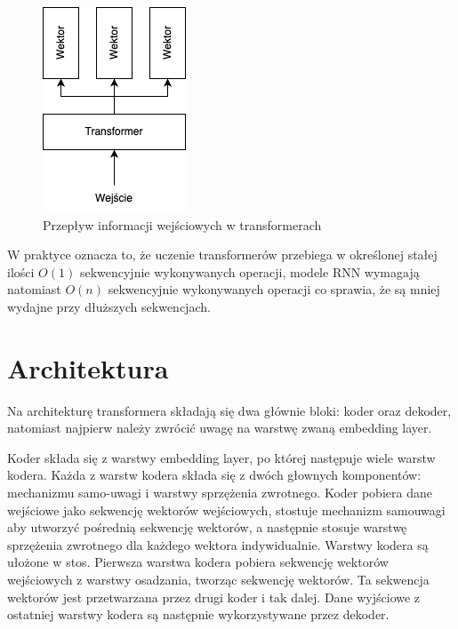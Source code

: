 \documentclass[12pt,a4paper,twoside]{book} %
\begin{document}
\begin{figure}[H]
    \centering
	\includegraphics[scale=0.60]{figs/transformer.png}
	\caption{Przepływ informacji wejściowych w transformerach}
	\label{fig:transformer_schema}
\end{figure}

W praktyce oznacza to, że uczenie transformerów przebiega w określonej stałej ilości $O(1)$ sekwencyjnie wykonywanych operacji, modele RNN wymagają natomiast $O(n)$ sekwencyjnie wykonywanych operacji co sprawia, że są mniej wydajne przy dłuższych sekwencjach.

\section{Architektura}

Na architekturę transformera składają się dwa głównie bloki: koder oraz dekoder, natomiast najpierw należy zwrócić uwagę na warstwę zwaną embedding layer.
 

Koder składa się z warstwy embedding layer, po której następuje wiele warstw kodera.
Każda z warstw kodera składa się z dwóch głownych komponentów: mechanizmu samo-uwagi i warstwy sprzężenia zwrotnego. 
Koder pobiera dane wejściowe jako sekwencję wektorów wejściowych, stostuje mechanizm samouwagi aby utworzyć pośrednią sekwencję wektorów, a następnie stosuje warstwę sprzężenia zwrotnego dla każdego wektora indywidualnie.
Warstwy kodera są ułożone w stos. 
Pierwsza warstwa kodera pobiera sekwencję wektorów wejściowych z warstwy osadzania, tworząc sekwencję wektorów. 
Ta sekwencja wektorów jest przetwarzana przez drugi koder i tak dalej. 
Dane wyjściowe z ostatniej warstwy kodera są następnie wykorzystywane przez dekoder.
\end{document}
